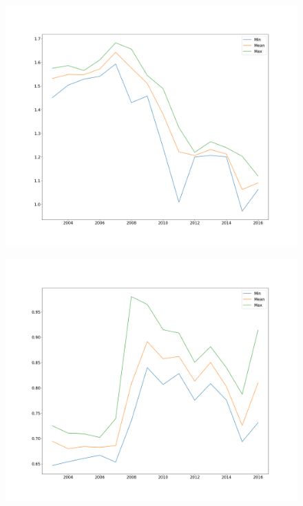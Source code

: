 \documentclass[a4paper]{article}
\begin{document}
\begin{figure}
	\begin{minipage}{.5\textwidth}
	\centering
	\includegraphics[width=\linewidth]{Figures/stats_chf}
	\label{fig:3}
	\end{minipage}%
	\begin{minipage}{.5\textwidth}
	\centering
	\includegraphics[width=\linewidth]{Figures/stats_gbp}
	\label{fig:4}
	\end{minipage}
	\begin{minipage}{.5\textwidth}

\end{minipage}
\end{figure}
\end{document}
